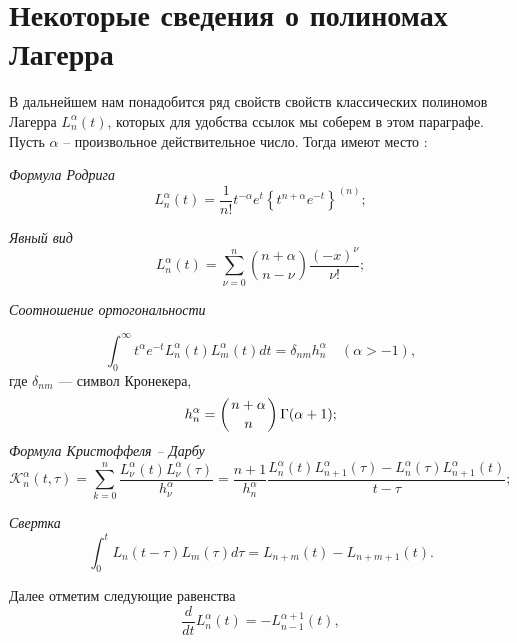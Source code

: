 \section{Некоторые сведения о полиномах Лагерра}
В дальнейшем нам понадобится ряд свойств свойств классических полиномов Лагерра $L_n^{\alpha}(t)$, которых для удобства ссылок мы соберем в этом параграфе. Пусть $\alpha$ -- произвольное действительное число. Тогда  имеют место \cite{Sege}:

\textit{Формула Родрига}
\begin{equation}\label{laplas-2.1}
L_n^{\alpha}(t) = \frac{1}{n!}t^{-\alpha}e^{t} \left\{ t^{n+\alpha} e^{-t} \right\}^{(n)};
\end{equation}

\textit{Явный вид}
\begin{equation}\label{laplas-2.2}
L_n^\alpha(t) =
\sum\limits_{\nu=0}^{n}
\binom{n+\alpha}{n-\nu}
\frac{(-x)^\nu}{\nu!};
\end{equation}

\textit{Соотношение ортогональности}

\begin{equation}
\label{laplas-2.3}
\int_0^{\infty} t^{\alpha} e^{-t} L^{\alpha}_{n}(t) L^{\alpha}_{m}(t) dt = \delta_{nm} h^{\alpha}_n \quad (\alpha > -1),
\end{equation}
где $\delta_{nm}$ --- символ Кронекера,
\begin{equation}\label{laplas-2.4}
h^{\alpha}_n = \left( n+\alpha \atop n \right) \Gamma(\alpha +1);
\end{equation}
\textit{Формула Кристоффеля -- Дарбу}
\begin{equation}\label{laplas-2.5}
\mathcal{K}_n^\alpha(t,\tau)=
\sum\limits_{k=0}^{n}\frac{L_\nu^\alpha(t)L_\nu^\alpha(\tau)}{h_\nu^\alpha}=
\frac{n+1}{h_n^\alpha}
\frac{L_n^\alpha(t)L_{n+1}^\alpha(\tau) - L_n^\alpha(\tau)L_{n+1}^\alpha(t)}{t-\tau};
\end{equation}

\textit{Свертка}
\begin{equation}
\label{laplas-2.6}
\int_0^{t} L_{n}(t-\tau) L_{m}(\tau) d\tau = L_{n+m}(t) - L_{n+m+1}(t).
\end{equation}

Далее отметим следующие равенства
\begin{equation}\label{laplas-2.7}
\frac{d}{dt} L_n^{\alpha}(t) = -L_{n-1}^{\alpha+1}(t),
\end{equation}

